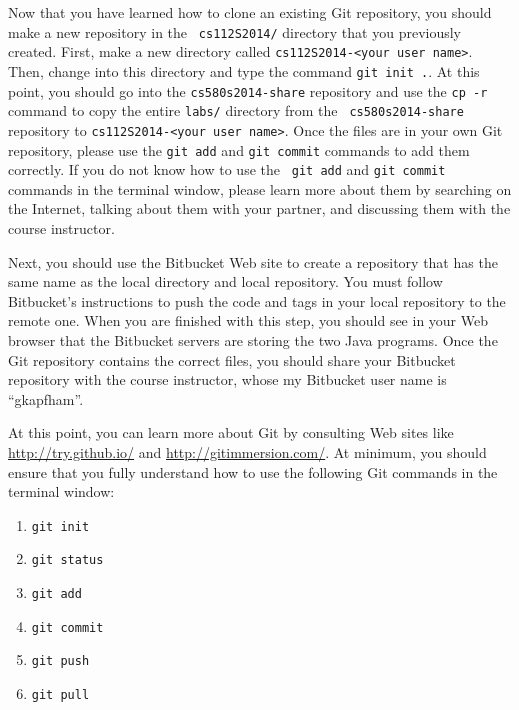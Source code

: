 Now that you have learned how to clone an existing Git repository, you should make a new repository in the {\tt
cs112S2014/} directory that you previously created.  First, make a new directory called {\tt cs112S2014-<your user
name>}. Then, change into this directory and type the command {\tt git init .}.  At this point, you should go into the
{\tt cs580s2014-share} repository and use the {\tt cp -r} command to copy the entire {\tt labs/} directory from the {\tt
cs580s2014-share} repository to {\tt cs112S2014-<your user name>}.  Once the files are in your own Git repository,
please use the {\tt git add} and {\tt git commit} commands to add them correctly. If you do not know how to use the {\tt
git add} and {\tt git commit} commands in the terminal window, please learn more about them by searching on the
Internet, talking about them with your partner, and discussing them with the course instructor.

Next, you should use the Bitbucket Web site to create a repository that has the same name as the local directory and
local repository.  You must follow Bitbucket's instructions to push the code and tags in your local repository to the
remote one. When you are finished with this step, you should see in your Web browser that the Bitbucket servers are
storing the two Java programs. Once the Git repository contains the correct files, you should share your Bitbucket
repository with the course instructor, whose my Bitbucket user name is ``gkapfham''.

At this point, you can learn more about Git by consulting Web sites like \url{http://try.github.io/} and
\url{http://gitimmersion.com/}.  At minimum, you should ensure that you fully understand how to use the following Git
commands in the terminal window:

\begin{enumerate} 
			
	\item {\tt git init}

	\item {\tt git status}

	\item {\tt git add} 

	\item {\tt git commit}

	\item {\tt git push}

	\item {\tt git pull} 

\end{enumerate}

